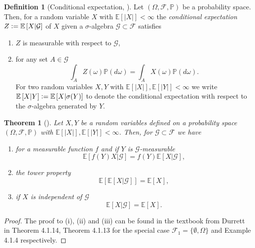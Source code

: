 \documentclass[12pt]{article}
\newtheorem{theorem}{Theorem}[section]
\theoremstyle{definition}
\newtheorem{definition}[definition]{Definition}
\numberwithin{equation}{section}
\newcommand{\BP}{\mathbb{P}}
\newcommand{\CF}{\mathcal{F}}
\newcommand{\CG}{\mathcal{G}}
\newcommand{\ev}[1]{\mathbb{E}\left[{#1}\right]}
\newcommand{\defeq}{\vcentcolon=}
\begin{document}
 \begin{definition}[Conditional expectation, ]
  Let  $(\Omega, \CF, \BP)$ be a probability space. Then, for a random variable $X$ with $\ev{|X|} < \infty$ the \emph{conditional expectation} $Z \defeq \ev{X|\CG}$ of $X$ given a $\sigma$-algebra $\CG \subset \CF$ satisfies
  \begin{enumerate}[label=(\roman*)]
    \item $Z$ is measurable with respect to $\CG$,
    \item for any set $A \in \CG$
    \begin{equation*}
      \int_A Z(\omega)\BP(d\omega) = \int_A X(\omega)\BP(d\omega).
    \end{equation*}
    For two random variables $X,Y$ with $\ev{|X|},\ev{|Y|} < \infty$ we write $\ev{X|Y} \defeq \ev{X|\sigma(Y)}$ to denote the conditional expectation with respect to the $\sigma$-algebra generated by $Y$.
  \end{enumerate}
 \end{definition}
 \begin{theorem}[]
  \label{thm:conditional_expectation}
  Let $X, Y$ be a random variables defined on a probability space $(\Omega, \CF, \BP)$ with $\ev{|X|},\ev{|Y|} < \infty$. Then, for $\CG \subset \CF$ we have
  \begin{enumerate}[label=(\roman*)]
    \item for a measurable function $f$ and if $Y$ is $\CG$-measurable
    \begin{equation*}
      \ev{f(Y)X|\CG} = f(Y)\ev{X|\CG},
    \end{equation*}
    \item the tower property
    \begin{equation*}
      \ev{\ev{X|\CG}} = \ev{X},
    \end{equation*}
    \item if $X$ is independent of $\CG$
    \begin{equation*}
      \ev{X|\CG} = \ev{X}.
    \end{equation*}
    
  \end{enumerate}
 \end{theorem}
 \begin{proof}
  The proof to (i), (ii) and (iii) can be found in the textbook from Durrett \cite{durrettProbabilityTheoryExamples2019} in Theorem 4.1.14, Theorem 4.1.13 for the special case $\CF_1 = \{\emptyset, \Omega\}$ and Example 4.1.4 respectively.
 \end{proof}
\end{document}
